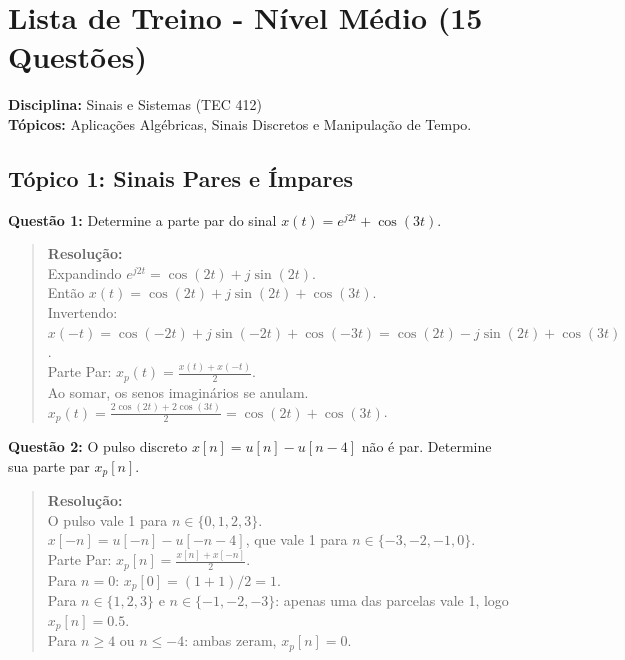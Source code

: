 \chapter{Lista de Treino - Nível Médio (15 Questões)}

\textbf{Disciplina:} Sinais e Sistemas (TEC 412)\\
\textbf{Tópicos:} Aplicações Algébricas, Sinais Discretos e Manipulação de Tempo.

\section{Tópico 1: Sinais Pares e Ímpares}\label{tuxf3pico-1-sinais-pares-e-uxedmpares}

\textbf{Questão 1:} Determine a parte par do sinal \(x(t) = e^{j2t} + \cos(3t)\).

\begin{quote}
\textbf{Resolução:}\\
Expandindo \(e^{j2t} = \cos(2t) + j\sin(2t)\).\\
Então \(x(t) = \cos(2t) + j\sin(2t) + \cos(3t)\).\\
Invertendo: \(x(-t) = \cos(-2t) + j\sin(-2t) + \cos(-3t) = \cos(2t) - j\sin(2t) + \cos(3t)\).\\
Parte Par: \(x_p(t) = \frac{x(t) + x(-t)}{2}\).\\
Ao somar, os senos imaginários se anulam.\\
\(x_p(t) = \frac{2\cos(2t) + 2\cos(3t)}{2} = \cos(2t) + \cos(3t)\).
\end{quote}

\textbf{Questão 2:} O pulso discreto \(x[n] = u[n] - u[n-4]\) não é par. Determine sua parte par \(x_p[n]\).

\begin{quote}
\textbf{Resolução:}\\
O pulso vale 1 para \(n \in \{0, 1, 2, 3\}\).\\
\(x[-n] = u[-n] - u[-n-4]\), que vale 1 para \(n \in \{-3, -2, -1, 0\}\).\\
Parte Par: \(x_p[n] = \frac{x[n] + x[-n]}{2}\).\\
Para \(n=0\): \(x_p[0] = (1+1)/2 = 1\).\\
Para \(n \in \{1, 2, 3\}\) e \(n \in \{-1, -2, -3\}\): apenas uma das parcelas vale 1, logo \(x_p[n] = 0.5\).\\
Para \(n \ge 4\) ou \(n \le -4\): ambas zeram, \(x_p[n]=0\).
\end{quote}

